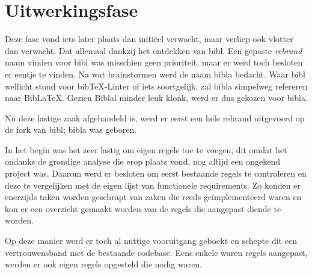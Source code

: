 \chapter{Uitwerkingsfase}
\label{ch:uitwerkingsfase}


Deze fase vond iets later plaats dan initiëel verwacht, maar verliep ook vlotter dan verwacht. Dat allemaal dankzij het ontdekken van bibl. Een gepaste \emph{rebrand} naam vinden voor bibl was misschien geen prioriteit, maar er werd toch besloten er eentje te vinden. Na wat brainstormen werd de naam bibla bedacht. Waar bibl wellicht stond voor bibTeX-Linter of iets soortgelijk, zal bibla simpelweg refereren naar BibLaTeX. Gezien Biblal minder leuk klonk, werd er dus gekozen voor bibla.

Nu deze lastige zaak afgehandeld is, werd er eerst een hele rebrand uitgevoerd op de fork van bibl; bibla was geboren.

In het begin was het zeer lastig om eigen regels toe te voegen, dit omdat het ondanks de grondige analyse die erop plaats vond, nog altijd een ongekend project was. Daarom werd er besloten om eerst bestaande regels te controleren en deze te vergelijken met de eigen lijst van functionele requirements.
Zo konden er enerzijds taken worden geschrapt van zaken die reeds geïmplementeerd waren en kon er een overzicht gemaakt worden van de regels die aangepast diende te worden. 

Op deze manier werd er toch al nuttige vooruitgang geboekt en schepte dit een vertrouwensband met de bestaande codebase. Eens enkele waren regels aangepast, werden er ook eigen regels opgesteld die nodig waren.
